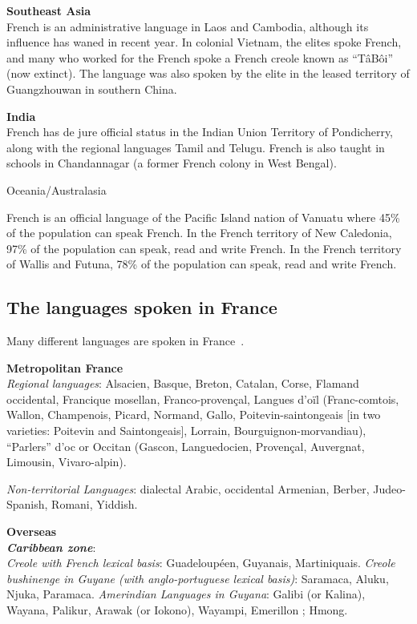 \begin{multicols}{2}
{\bf Southeast Asia }\\
French is an administrative language in Laos and Cambodia, although
its influence has waned in recent year. In colonial Vietnam, the
elites spoke French, and many who worked for the French spoke a French
creole known as ``TâBôi'' (now extinct). The language was also spoken
by the elite in the leased territory of Guangzhouwan in southern
China.

{\bf India}\\
French has de jure official status in the Indian Union Territory of
Pondicherry, along with the regional languages Tamil and
Telugu. French is also taught in schools in Chandannagar (a former
French colony in West Bengal).

\vspace{0.5cm}
\begin{center}
{\sc Oceania/Australasia}
\end{center}
French is an official language of the Pacific Island nation of Vanuatu
where 45\% of the population can speak French. In the French territory
of New Caledonia, 97\% of the population can speak, read and write
French. In the French territory of Wallis and Futuna, 78\% of the
population can speak, read and write French.

\subsection{The languages spoken in France}
\label{languageSpokenInTheFranceEn}
Many different languages are spoken in France~\cite{francais}.

{\bf Metropolitan France}\\
{\em Regional languages}: Alsacien, Basque, Breton, Catalan, Corse, Flamand occidental, Francique mosellan, Franco-provençal, Langues d'oïl (Franc-comtois, Wallon, Champenois, Picard, Normand, Gallo, Poitevin-saintongeais [in two varieties: Poitevin and Saintongeais], Lorrain, Bourguignon-morvandiau), ``Parlers'' d'oc or Occitan (Gascon, Languedocien, Provençal, Auvergnat, Limousin, Vivaro-alpin).

{\em Non-territorial Languages}: dialectal Arabic, occidental Armenian, Berber, Judeo-Spanish, Romani, Yiddish.

{\bf Overseas}\\
\textbf{ \emph{Caribbean zone}}:\\
{\em Creole with French lexical basis}: Guadeloupéen, Guyanais, Martiniquais.
{\em Creole bushinenge in Guyane (with anglo-portuguese lexical basis)}: Saramaca, Aluku, Njuka, Paramaca.
{\em Amerindian Languages in Guyana}: Galibi (or Kalina), Wayana, Palikur, Arawak (or Iokono), Wayampi, Emerillon ; Hmong.


\end{multicols}

